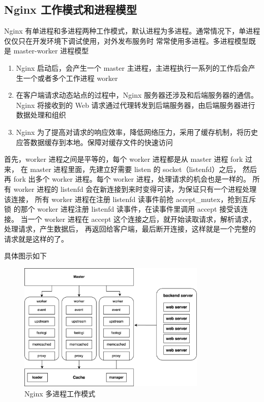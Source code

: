\subsection{Nginx 工作模式和进程模型}

Nginx 有单进程和多进程两种工作模式，默认进程为多进程。通常情况下，单进程仅仅只在开发环境下调试使用，对外发布服务时
常常使用多进程。多进程模型既是 master-worker 进程模型

\noindent\begin{enumerate}
  \item Nginx 启动后，会产生一个 master 主进程，主进程执行一系列的工作后会产生一个或者多个工作进程 worker
  \item 在客户端请求动态站点的过程中，Nginx 服务器还涉及和后端服务器的通信。Nginx 将接收到的 Web 请求通过代理转发到后端服务器，由后端服务器进行数据处理和组织
  \item Nginx 为了提高对请求的响应效率，降低网络压力，采用了缓存机制，将历史应答数据缓存到本地。保障对缓存文件的快速访问
\end{enumerate}

首先，worker 进程之间是平等的，每个 worker 进程都是从 master 进程 fork 过来，
在 master 进程里面，先建立好需要 listen 的 socket（listenfd）之后，
然后再 fork 出多个 worker 进程。每个 worker 进程，处理请求的机会也是一样的。
所有 worker 进程的 listenfd 会在新连接到来时变得可读，为保证只有一个进程处理该连接，
所有 worker 进程在注册 listenfd 读事件前抢 accept\_mutex，抢到互斥锁
的那个 worker 进程注册 listenfd 读事件，在读事件里调用 accept 接受该连接。
当一个 worker 进程在 accept 这个连接之后，就开始读取请求，解析请求，处理请求，产生数据后，
再返回给客户端，最后断开连接，这样就是一个完整的请求就是这样的了。

具体图示如下

\noindent\begin{figure}[htb]
  \centering
  \includegraphics[width=0.8\textwidth]{figures/master-worker.png}
  \caption{Nginx 多进程工作模式}
\end{figure}

